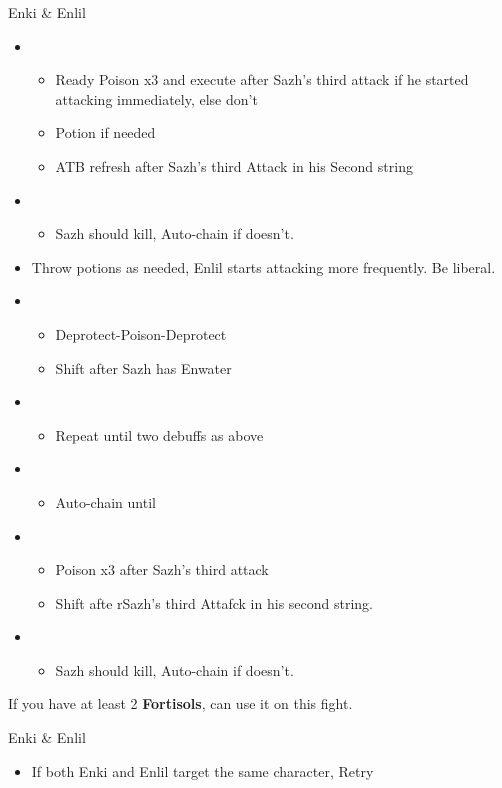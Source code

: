 \begin{paracol}{2}
\begin{battle}{Enki \& Enlil }
\begin{itemize}
\begin{itemize}
			      \end{itemize}
			\item \sixth
			      \begin{itemize}
				      \item Ready Poison x3 and execute after Sazh's third attack if he started attacking immediately, else don't
				      \item Potion if needed
				      \item ATB refresh after Sazh's third Attack in his Second string
			      \end{itemize}
			\item \first
			      \begin{itemize}
				      \item Sazh should kill, Auto-chain if doesn't.
			      \end{itemize}
			\item Throw potions as needed, Enlil starts attacking more frequently. Be liberal.
			\item \third
			      \begin{itemize}
				      \item Deprotect-Poison-Deprotect
				      \item Shift after Sazh has Enwater
			      \end{itemize}
			\item \fifth
			      \begin{itemize}
				      \item Repeat until two debuffs as above
			      \end{itemize}
			\item \fourth
			      \begin{itemize}
				      \item Auto-chain until \stagger
			      \end{itemize}
			\item \sixth
			      \begin{itemize}
				      \item Poison x3 after Sazh's third attack
				      \item Shift afte rSazh's third Attafck in his second string.
			      \end{itemize}
			\item \first
			      \begin{itemize}
				      \item Sazh should kill, Auto-chain if doesn't.
			      \end{itemize}
		\end{itemize}	
\end{battle}
\switchcolumn
If you have at least 2 \textbf{Fortisols}, can use it on this fight.
\begin{battle}{Enki \& Enlil}
\begin{itemize}
    \item If both Enki and Enlil target the same character, Retry
    

\end{itemize}
\end{battle}
\end{paracol}
